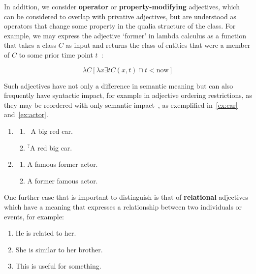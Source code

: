 \documentclass[11pt]{article}
\begin{document}
In addition, we consider \textbf{operator} or \textbf{property-modifying} adjectives, 
which can be considered to overlap with privative adjectives, but
are understood as operators that change some property in the qualia 
structure of the class. For example, we may express the adjective `former' 
in lambda calculus as a function that takes a class $C$ as input and returns the class 
of entities that were a member of $C$ to some prior time point $t$~\cite{partee2003there}:

$$\lambda C [\lambda x \exists t C(x,t) \cap t < \mathrm{now}]$$

Such adjectives have not only a difference in semantic meaning but can also 
frequently have syntactic impact, for example in adjective ordering 
restrictions, as they may be reordered with only semantic 
impact~\cite{teodorescu2006adjective}, as exemplified in~\ref{ex:car} and~\ref{ex:actor}.

\begin{enumerate}[resume]
\item \begin{enumerate}
\item \ A big red car.
\item $^?$A red big car.
\end{enumerate} 
\label{ex:car}
\item \begin{enumerate}
\item A famous former actor.
\item A former famous actor.
\end{enumerate}
\label{ex:actor}
\end{enumerate}

One further case that is important to distinguish is that of \textbf{relational} adjectives which have a meaning 
that expresses a relationship between two individuals or events, for example:

\begin{enumerate}[resume]
\item He is related to her.
\item She is similar to her brother. 
\item This is useful for something. 
\end{enumerate}
\end{document}

